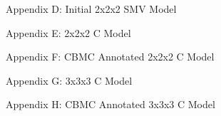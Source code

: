 \documentclass{article}
\begin{document}
\newpage

\begin{center}
Appendix D: Initial 2x2x2 SMV Model
\end{center}



\newpage

\begin{center}
Appendix E: 2x2x2 C Model
\end{center}



\newpage

\begin{center}
Appendix F: CBMC Annotated 2x2x2 C Model
\end{center}



\newpage

\begin{center}
Appendix G: 3x3x3 C Model
\end{center}



\newpage

\begin{center}
Appendix H: CBMC Annotated 3x3x3 C Model
\end{center}



\newpage
\end{document}
